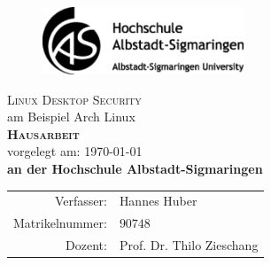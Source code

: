 	\begin{titlepage}
		\renewcommand{\baselinestretch}{1}
		\begin{figure}[htbp]
			\centering
			\includegraphics[width=6cm]{./abbildungen/Logo}
			\label{fig:Logo}
		\end{figure}
		\vspace*{2cm}
		\begin{center}
			\huge \textsf{\textsc{Linux Desktop Security} \\
				{\Large am Beispiel Arch Linux}} \\
			\vspace{2cm}
			\LARGE\textbf{\textsc{Hausarbeit}}\\
			\vspace{0.5cm}
			\normalsize
			vorgelegt am: \today \\
			\vspace{1cm}
			\large \textbf{an der Hochschule Albstadt-Sigmaringen}\\
			\vspace*{\fill}
		\end{center}
		\normalsize{
			\begin{tabular}{rl}
				Verfasser: & {Hannes Huber} \\
				Matrikelnummer: & $ 90748 $\\
				Dozent: & {Prof. Dr. Thilo Zieschang} \\
			\end{tabular}\\
		}
	\end{titlepage}
